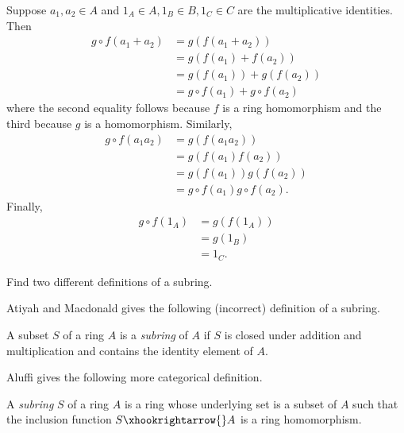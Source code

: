 \documentclass[12 pt, letterpaper]{hmcpset}
\begin{document}
\begin{solution}
	Suppose $a_{1}, a_{2} \in A$ and $1_{A} \in A, 1_{B} \in B, 1_{C} \in C$ are the multiplicative identities. Then
	\begin{align*}
		g \circ f(a_{1} + a_{2}) & = g(f(a_{1} + a_{2})) \\
					 & = g(f(a_{1}) + f(a_{2})) \\
					 & = g(f(a_{1})) + g(f(a_{2})) \\
					 & = g \circ f(a_{1}) + g \circ f(a_{2})
	\end{align*}
	where the second equality follows because $f$ is a ring homomorphism and the third because $g$ is a homomorphism. Similarly,
	\begin{align*}
		g \circ f(a_{1} a_{2}) & = g(f(a_{1} a_{2})) \\
				       & = g(f(a_{1}) f(a_{2})) \\
				       & = g(f(a_{1})) g(f(a_{2})) \\
				       & = g \circ f(a_{1}) g \circ f(a_{2}).
	\end{align*}
	Finally,
	\begin{align*}
		g \circ f(1_{A}) & = g(f(1_{A})) \\
				 & = g(1_{B}) \\
				 & = 1_{C}.
	\end{align*}
\end{solution}

\pagebreak

\begin{problem}[Lecture 2. \#1]
	Find two different definitions of a subring.
\end{problem}

\begin{solution}
	Atiyah and Macdonald \cite[pg. 2]{atiyah-macdonald-1969} gives the following (incorrect) definition of a subring.
	\begin{definition}[subring]
		A subset $S$ of a ring $A$ is a \emph{subring} of $A$ if $S$ is closed under addition and multiplication and contains the identity element of $A$.
	\end{definition}

	Aluffi \cite[pg. 132]{aluffi-2009} gives the following more categorical definition.

	\begin{definition}[subring]
		A \emph{subring} $S$ of a ring $A$ is a ring whose underlying set is a subset of $A$ such that the inclusion function $S \xhookrightarrow{} A$ is a ring homomorphism.
	\end{definition}
\end{solution}



\end{document}

